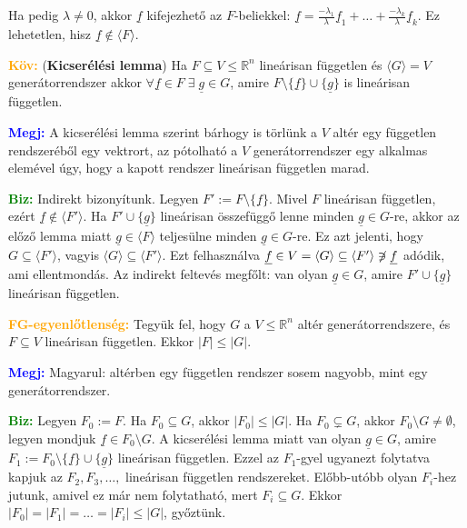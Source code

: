 \documentclass[../szamtud.tex]{subfiles}
\begin{document}
        Ha pedig $\lambda \neq 0$, akkor $\underline{f}$ kifejezhető az $F$-beliekkel: $\underline{f} = \frac{-\lambda_1}{\lambda} \underline{f}_1 + \dots + \frac{-\lambda_k}{\lambda} \underline{f}_k$. Ez lehetetlen, hisz $\underline{f} \notin \langle F \rangle$.

        \textcolor{orange}{\textbf{Köv:}} (\textbf{Kicserélési lemma}) Ha $F \subseteq V \leq \mathbb{R}^n$ lineárisan független és $\langle G \rangle = V$ generátorrendszer akkor $\forall \underline{f} \in F \; \exists \; \underline{g} \in G$, amire $F \setminus \{\underline{f}\} \cup \{\underline{g}\}$ is lineárisan független.

        \textcolor{blue}{\textbf{Megj:}} A kicserélési lemma szerint bárhogy is törlünk a $V$ altér egy független rendszeréből egy vektrort, az pótolható a $V$ generátorrendszer egy alkalmas elemével úgy, hogy a kapott rendszer lineárisan független marad.

        \textcolor{green}{\textbf{Biz:}} Indirekt bizonyítunk. Legyen $F' := F \setminus \{\underline{f}\}$. Mivel $F$ lineárisan független, ezért $\underline{f} \notin \langle F' \rangle$. Ha $F' \cup \{\underline{g}\}$ lineárisan összefüggő lenne minden $\underline{g} \in G$-re, akkor az előző lemma miatt $\underline{g} \in \langle F \rangle$ teljesülne minden $\underline{g} \in G$-re. Ez azt jelenti, hogy $G \subseteq \langle F'\rangle$, vagyis $\langle G \rangle \subseteq \langle F' \rangle$. Ezt felhasználva $\underline{f} \in V = \langle G \rangle \subseteq \langle F' \rangle \not\owns \underline{f}$ adódik, ami ellentmondás. Az indirekt feltevés megfőlt: van olyan $\underline{g} \in G$, amire $F' \cup \{\underline{g}\}$ lineárisan független.

        \textcolor{orange}{\textbf{FG-egyenlőtlenség:}} Tegyük fel, hogy $G$ a $V \leq \mathbb{R}^n$ altér generátorrendszere, és $F \subseteq V$ lineárisan független. Ekkor $|F| \leq |G|$.

        \textcolor{blue}{\textbf{Megj:}} Magyarul: altérben egy független rendszer sosem nagyobb, mint egy generátorrendszer.

        \textcolor{green}{\textbf{Biz:}} Legyen $F_0 := F$. Ha $F_0 \subseteq G$, akkor $|F_0| \leq |G|$. Ha $F_0 \subsetneq G$, akkor $F_0 \setminus G \neq \emptyset$, legyen mondjuk $\underline{f} \in F_0 \setminus G$. A kicserélési lemma miatt van olyan $\underline{g} \in G$, amire $F_1 := F_0 \setminus \{\underline{f}\} \cup \{\underline{g}\}$ lineárisan független. Ezzel az $F_1$-gyel ugyanezt folytatva kapjuk az $F_2, F_3, \dots,$ lineárisan független rendszereket. Előbb-utóbb olyan $F_i$-hez jutunk, amivel ez már nem folytatható, mert $F_i \subseteq G$. Ekkor $|F_0| = |F_1| = \dots = |F_i| \leq |G|$, győztünk.
\end{document}

